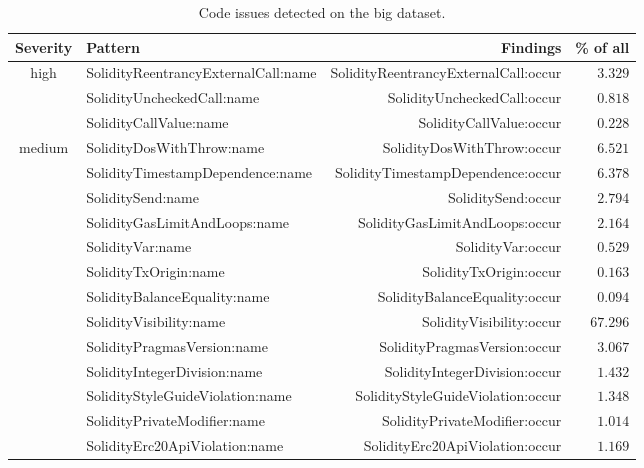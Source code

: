 \let\letcs\texapiletcs
\begin{table}[t]
	\centering
	\caption{Code issues detected on the big dataset.}
	\begin{tabular}{|c|l|r|r|}
		\hline
		\textbf{Severity} & \textbf{Pattern} & \textbf{Findings} & \textbf{\% of all} \\
		\hline
		\multirow{3}{*}{high} & {\usevalue SolidityReentrancyExternalCall:name } & {\usevalue SolidityReentrancyExternalCall:occur } & $3.329$ \\
		 & {\usevalue SolidityUncheckedCall:name } & {\usevalue SolidityUncheckedCall:occur } & $0.818$ \\
		 & {\usevalue SolidityCallValue:name } & {\usevalue SolidityCallValue:occur } & $0.228$ \\
		\hline
		\multirow{8}{*}{medium} & {\usevalue SolidityDosWithThrow:name } & {\usevalue SolidityDosWithThrow:occur } & $6.521$ \\
		& {\usevalue SolidityTimestampDependence:name } & {\usevalue SolidityTimestampDependence:occur } & $6.378$ \\
		& {\usevalue SoliditySend:name } & {\usevalue SoliditySend:occur } & $2.794$ \\
		& {\usevalue SolidityGasLimitAndLoops:name } & {\usevalue SolidityGasLimitAndLoops:occur } & $2.164$ \\
		& {\usevalue SolidityVar:name } & {\usevalue SolidityVar:occur } & $0.529$ \\
		& {\usevalue SolidityTxOrigin:name } & {\usevalue SolidityTxOrigin:occur } & $0.163$ \\
		& {\usevalue SolidityBalanceEquality:name } & {\usevalue SolidityBalanceEquality:occur } & $0.094$ \\
		\hline
		\multirow{10}{*}{low} & {\usevalue SolidityVisibility:name } & {\usevalue SolidityVisibility:occur } & $67.296$ \\& {\usevalue SolidityPragmasVersion:name } & {\usevalue SolidityPragmasVersion:occur } & $3.067$ \\
		& {\usevalue SolidityIntegerDivision:name } & {\usevalue SolidityIntegerDivision:occur } & $1.432$ \\
		& {\usevalue SolidityStyleGuideViolation:name } & {\usevalue SolidityStyleGuideViolation:occur } & $1.348$ \\
		& {\usevalue SolidityPrivateModifier:name } & {\usevalue SolidityPrivateModifier:occur } & $1.014$ \\
		& {\usevalue SolidityErc20ApiViolation:name } & {\usevalue SolidityErc20ApiViolation:occur } & $1.169$ \\

\end{tabular}
\end{table}
